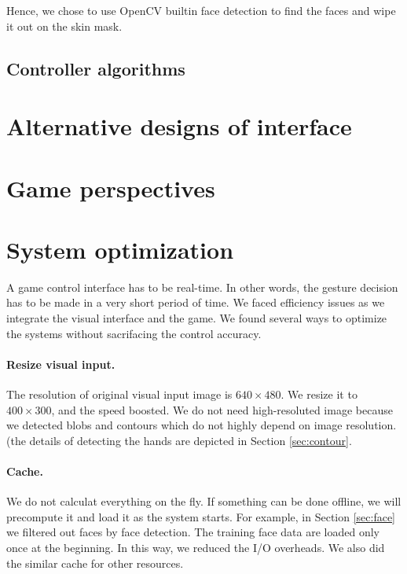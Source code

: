 \documentclass[10pt,twocolumn,letterpaper]{article}
\begin{document}
 Hence, we chose to use OpenCV builtin face detection to find the faces 
 and wipe it out on the skin mask.

\subsection{Controller algorithms}

\section{Alternative designs of interface}

\section{Game perspectives}

\section{System optimization}
A game control interface has to be real-time. In other words, 
the gesture decision has to be made in a very short period of time. 
We faced efficiency issues as we integrate the visual interface and 
the game. We found several ways to optimize the systems without 
sacrifacing the control accuracy.

\paragraph{Resize visual input.} The resolution of 
original visual input image is $640 \times 480$. 
We resize it to $400 \times 300$, and the speed boosted.
We do not need high-resoluted image because we detected 
blobs and contours which do not highly depend on image resolution. 
(the details of detecting the hands are depicted in Section 
\ref{sec:contour}.

\paragraph{Cache.} We do not calculat everything on the fly. 
If something can be done offline, we will precompute it and 
load it as the system starts. For example, in Section 
\ref{sec:face} we filtered out faces by face detection. 
The training face data are loaded only once at the beginning. 
In this way, we reduced the I/O overheads. We also did the 
similar cache for other resources.
\end{document}
